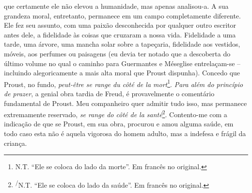 que certamente ele não elevou a humanidade, mas apenas analisou-a. A sua
grandeza moral, entretanto, permanece em um campo completamente
diferente. Ele fez seu assunto, com uma paixão desconhecida por qualquer
outro escritor antes dele, a fidelidade às coisas que cruzaram a nossa
vida. Fidelidade a uma tarde, uma árvore, uma mancha solar sobre a
tapeçaria, fidelidade aos vestidos, móveis, aos perfumes ou paisagens
(eu devia ter notado que a descoberta do último volume no qual o caminho
para Guermantes e Méseglise entrelaçam-se -- incluindo alegoricamente a
mais alta moral que Proust dispunha). Concedo que Proust, no fundo,
\emph{peut-être se range du côté de la mort}\footnote{N.T. ``Ele se
  coloca do lado da morte''. Em francês no original.}. \emph{Para além
do princípio de prazer}, a genial obra tardia de Freud, é provavelmente
o comentário fundamental de Proust. Meu companheiro quer admitir tudo
isso, mas permanece extremamente reservado, \emph{se range do côté de la
santé}\footnote{\textsuperscript{/}N.T. ``Ele se coloca do lado da
  saúde''. Em francês no original.}. Contento-me com a indicação de que
se Proust, em sua obra, procurou e amou alguma saúde, em todo caso esta
não é aquela vigorosa do homem adulto, mas a indefesa e frágil da
criança.

